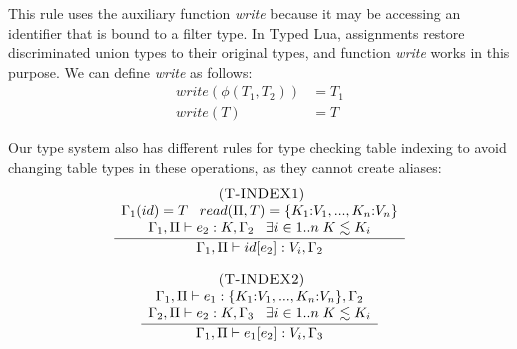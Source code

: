 \documentclass{sigplanconf}
\newcommand{\mylabel}[1]{\; (\textsc{#1})}
\newcommand{\env}{\Gamma}
\newcommand{\penv}{\Pi}
\begin{document}
This rule uses the auxiliary function \emph{write} because it may be
accessing an identifier that is bound to a filter type.
In Typed Lua, assignments restore discriminated union types to their original types,
and function \emph{write} works in this purpose.
We can define \emph{write} as follows:
\begin{align*}
write(\phi(T_{1},T_{2})) & = T_{1}\\
write(T) & = T
\end{align*}

Our type system also has different rules for type checking table indexing to avoid
changing table types in these operations, as they cannot create aliases:
\[
\begin{array}{c}
\begin{array}{c}
\mylabel{T-INDEX1}\\
\dfrac{\begin{array}{c}
       \env_{1}(id) = T \;\;\;
       read(\penv, T) = \{K_{1}{:}V_{1}, ..., K_{n}{:}V_{n}\}\\
       \env_{1}, \penv \vdash e_{2}:K, \env_{2} \;\;\;
       \exists i \in 1{..}n \; K \lesssim K_{i}
       \end{array}}
      {\env_{1}, \penv \vdash id[e_{2}]:V_{i}, \env_{2}}
\end{array}
\\ \\
\begin{array}{c}
\mylabel{T-INDEX2}\\
\dfrac{\begin{array}{c}
       \env_{1}, \penv \vdash e_{1}:\{K_{1}{:}V_{1}, ..., K_{n}{:}V_{n}\}, \env_{2}\\
       \env_{2}, \penv \vdash e_{2}:K, \env_{3} \;\;\;
       \exists i \in 1{..}n \; K \lesssim K_{i}
       \end{array}}
      {\env_{1}, \penv \vdash e_{1}[e_{2}]:V_{i}, \env_{3}}
\end{array}
\end{array}
\]
\end{document}

